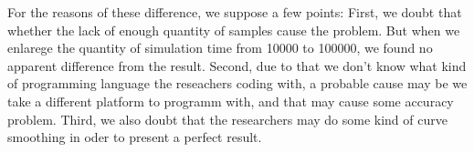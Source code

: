 For the reasons of these difference, we suppose a few points: First, we doubt that whether the lack of enough quantity of samples cause the problem. But when we enlarege the quantity of simulation time from 10000 to 100000, we found no apparent difference from the result. Second, due to that we don't know what kind of programming language the reseachers coding with, a probable cause may be we take a different platform to programm with, and that may cause some accuracy problem. Third, we also doubt that the researchers may do some kind of curve smoothing in oder to present a perfect result.